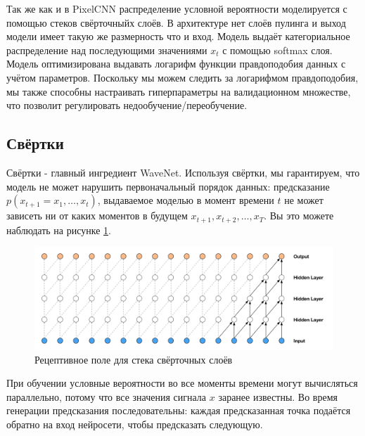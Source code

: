 \documentclass[../diploma.tex]{subfiles}
\begin{document}


Так же как и в PixelCNN \cite{article:oord2016conditional} распределение условной вероятности моделируется с помощью стеков свёрточныйх слоёв. В архитектуре нет слоёв пулинга и выход модели имеет такую же размерность что и вход. Модель выдаёт категориальное распределение над последующими значениями $x_t$ с помощью softmax слоя. Модель оптимизирована выдавать логарифм функции правдоподобия данных с учётом параметров. Поскольку мы можем следить за логарифмом правдоподобия, мы также способны настраивать гиперпараметры на валидационном множестве, что позволит регулировать недообучение/переобучение. 

\newpage
\subsection{Свёртки}

Свёртки - главный ингредиент WaveNet. Используя свёртки, мы гарантируем, что модель не может нарушить первоначальный порядок данных: предсказание $p(x_{t+1} = x_1, \dots, x_{t})$, выдаваемое моделью в момент времени $t$ не может зависеть ни от каких моментов в будущем $x_{t+1}, x_{t+2}, \dots, x_{T}$. Вы это можете наблюдать на рисунке \ref{fig:casual}.

\label{sec:convolutions}

\begin{figure}[ht!]
    \centering
  \includegraphics[scale=0.35]{img/casual}
  \caption{Рецептивное поле для стека свёрточных слоёв}
  \label{fig:casual}
\end{figure}

При обучении условные вероятности во все моменты времени могут вычисляться параллельно, потому что все значения сигнала $x$ заранее известны. Во время генерации предсказания последовательны: каждая предсказанная точка подаётся обратно на вход нейросети, чтобы предсказать следующую.
\end{document}
